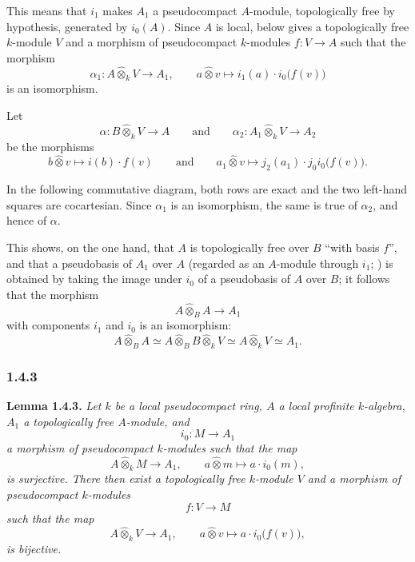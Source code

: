 \begin{samepage}
This means that \(i_1\) makes \(A_1\) a pseudocompact \(A\)-module,
topologically free by hypothesis, generated by \(i_0(A)\). Since
\(A\) is local,  below gives a topologically free
\(k\)-module \(V\) and a morphism of pseudocompact \(k\)-modules
\(f:V\to A\) such that the morphism
\[
  \alpha_1:
  A\widehat{\otimes}_kV\longrightarrow A_1,
  \qquad
  a\widehat{\otimes}v
  \longmapsto
  i_1(a)\cdot i_0\bigl(f(v)\bigr)
\]
is an isomorphism.
\end{samepage}
\begin{samepage}
Let
\[
  \alpha:B\widehat{\otimes}_kV\longrightarrow A
  \qquad\text{and}\qquad
  \alpha_2:A_1\widehat{\otimes}_kV\longrightarrow A_2
\]
be the morphisms
\[
  b\widehat{\otimes}v
  \longmapsto
  i(b)\cdot f(v)
  \qquad\text{and}\qquad
  a_1\widehat{\otimes}v
  \longmapsto
  j_2(a_1)\cdot j_0i_0\bigl(f(v)\bigr).
\]
\end{samepage}
In the following commutative diagram, both rows are exact and the two
left-hand squares are cocartesian. Since \(\alpha_1\) is an
isomorphism, the same is true of \(\alpha_2\), and hence of
\(\alpha\).
\begin{center}
  \label{sga3:VIIB:1.4.2:alpha-cocartesian-diagram}
  
\end{center}

This shows, on the one hand, that \(A\) is topologically free over
\(B\) ``with basis \(f\)'', and that a pseudobasis of \(A_1\) over \(A\)
(regarded as an \(A\)-module through \(i_1\); ) is obtained by
taking the image under \(i_0\) of a pseudobasis of \(A\) over \(B\); it
follows that the morphism
\[
  A\widehat{\otimes}_B A\longrightarrow A_1
\]
with components \(i_1\) and \(i_0\) is an isomorphism:
\[
  A\widehat{\otimes}_B A
  \simeq
  A\widehat{\otimes}_B B\widehat{\otimes}_kV
  \simeq
  A\widehat{\otimes}_kV
  \simeq
  A_1.
\]

\subsubsection*{1.4.3}
\label{sga3:VIIB:1.4.3}

\begin{samepage}
\noindent\textbf{Lemma 1.4.3.}
{\itshape Let \(k\) be a local pseudocompact ring, \(A\) a local
profinite \(k\)-algebra, \(A_1\) a topologically free \(A\)-module, and
\[
  i_0:M\longrightarrow A_1
\]
a morphism of pseudocompact \(k\)-modules such that the map
\[
  A\widehat{\otimes}_kM\longrightarrow A_1,
  \qquad
  a\widehat{\otimes}m
  \longmapsto
  a\cdot i_0(m),
\]
is surjective. There then exist a topologically free \(k\)-module
\(V\) and a morphism of pseudocompact \(k\)-modules
\[
  f:V\longrightarrow M
\]
such that the map
\[
  A\widehat{\otimes}_kV\longrightarrow A_1,
  \qquad
  a\widehat{\otimes}v
  \longmapsto
  a\cdot i_0\bigl(f(v)\bigr),
\]
is bijective.}
\end{samepage}

